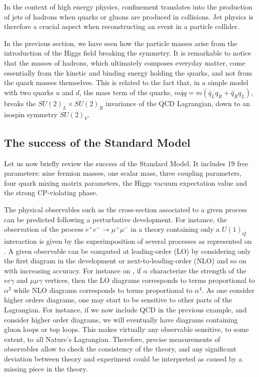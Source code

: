     In the context of high energy physics, confinement translates into the production of
    jets of hadrons when quarks or gluons are produced in collisions. Jet physics is
    therefore a crucial aspect when reconstructing an event in a particle collider.

    In the previous section, we have seen how the particle masses arise from the
    introduction of the Higgs field breaking the symmetry. It is remarkable to notice
    that the masses of hadrons, which ultimately composes everyday matter, come essentially
    from the kinetic and binding energy holding the quarks, and not from the quark masses
    themselves. This is related to the fact that, in a simple model with two quarks $u$ and
    $d$, the mass term of the quarks, $m\bar{q}q = m(\bar{q}_L q_R + \bar{q}_R q_L)$, breaks
    the $SU(2)_L \times SU(2)_R$ invariance of the QCD Lagrangian, down to an isospin symmetry
    $SU(2)_V$.

    \subsection{The success of the Standard Model \label{sec:standardModelSuccess}}

    Let us now briefly review the success of the Standard Model. It includes 19 free
    parameters: nine fermion masses, one scalar mass, three coupling parameters, four quark
    mixing matrix parameters, the Higgs vacuum expectation value and the strong CP-violating
    phase.

    The physical observables such as the cross-section associated to a given process
    can be predicted following a perturbative development. For instance, the observation
    of the process $e^+ e^- \rightarrow \mu^+ \mu^-$ in a theory containing only a $U(1)_Q$
    interaction is given by the superimposition of several processes as represented on
    . A given observable can be computed at leading-order
    (LO) by considering only the first diagram in the development or next-to-leading-order (NLO)
    and so on with increasing accuracy. For instance on ,
    if $\alpha$ characterize the strength of the $ee\gamma$ and $\mu\mu\gamma$ vertices, then
    the LO diagrams corresponds to terms proportional to $\alpha^2$ while NLO diagrams
    corresponds to terms proportional to $\alpha^4$. As one consider higher orders diagrams,
    one may start
    to be sensitive to other parts of the Lagrangian. For instance, if we now include QCD in
    the previous example, and consider higher order diagrams, we will eventually have diagrams
    containing gluon loops or top loops. This makes virtually any observable sensitive,
    to some extent, to all Nature's Lagrangian. Therefore, precise measurements of observables
    allow to check the consistency of the theory, and any significant deviation between
    theory and experiment could be interpreted as caused by a missing piece in the theory.

